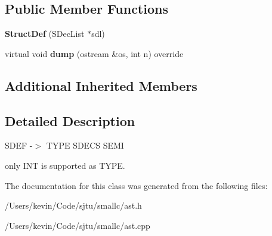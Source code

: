 \subsection*{Public Member Functions}
\begin{DoxyCompactItemize}
\item 
\mbox{\label{class_struct_def_aa4e355dd27ce1343f4f38e8032b2cd43}} 
{\bfseries Struct\+Def} (S\+Dec\+List $\ast$sdl)
\item 
\mbox{\label{class_struct_def_a107958af5eb5e2b4034960fd6b90ad99}} 
virtual void {\bfseries dump} (ostream \&os, int n) override
\end{DoxyCompactItemize}
\subsection*{Additional Inherited Members}


\subsection{Detailed Description}
S\+D\+EF -\/$>$ T\+Y\+PE S\+D\+E\+CS S\+E\+MI

only I\+NT is supported as T\+Y\+PE. 

The documentation for this class was generated from the following files\+:\begin{DoxyCompactItemize}
\item 
/\+Users/kevin/\+Code/sjtu/smallc/ast.\+h\item 
/\+Users/kevin/\+Code/sjtu/smallc/ast.\+cpp\end{DoxyCompactItemize}
